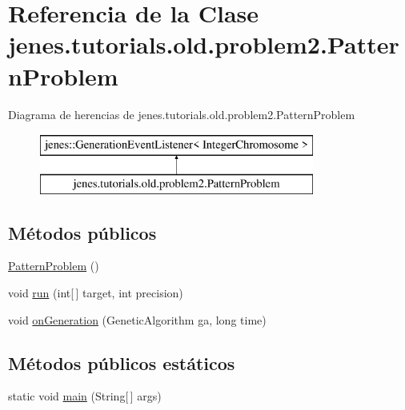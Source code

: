 \hypertarget{classjenes_1_1tutorials_1_1old_1_1problem2_1_1_pattern_problem}{\section{Referencia de la Clase jenes.\-tutorials.\-old.\-problem2.\-Pattern\-Problem}
\label{classjenes_1_1tutorials_1_1old_1_1problem2_1_1_pattern_problem}
}
Diagrama de herencias de jenes.\-tutorials.\-old.\-problem2.\-Pattern\-Problem\begin{figure}[H]
\begin{center}
\leavevmode
\includegraphics[height=2.000000cm]{classjenes_1_1tutorials_1_1old_1_1problem2_1_1_pattern_problem}
\end{center}
\end{figure}
\subsection*{Métodos públicos}
\begin{DoxyCompactItemize}
\item 
\hyperlink{classjenes_1_1tutorials_1_1old_1_1problem2_1_1_pattern_problem_adbf8a0345729346f9f03d8a7703f0d6d}{Pattern\-Problem} ()
\item 
void \hyperlink{classjenes_1_1tutorials_1_1old_1_1problem2_1_1_pattern_problem_aaeaef4b515a3fe02044c668a69f038a7}{run} (int\mbox{[}$\,$\mbox{]} target, int precision)
\item 
void \hyperlink{classjenes_1_1tutorials_1_1old_1_1problem2_1_1_pattern_problem_a1ed3cc6f1e19c0ffa6459e9c50aa9079}{on\-Generation} (Genetic\-Algorithm ga, long time)
\end{DoxyCompactItemize}
\subsection*{Métodos públicos estáticos}
\begin{DoxyCompactItemize}
\item 
static void \hyperlink{classjenes_1_1tutorials_1_1old_1_1problem2_1_1_pattern_problem_aab48fbec2976973bac23f7d26569453f}{main} (String\mbox{[}$\,$\mbox{]} args)
\end{DoxyCompactItemize}


